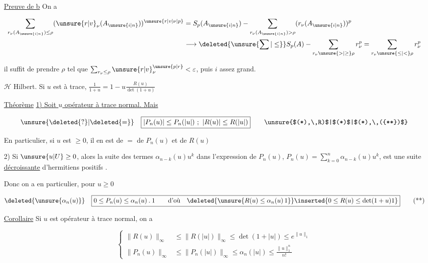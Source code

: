 
\uline{Preuve de b} On a

\[
\begin{aligned}
\sum_{r_\nu(A_{\unsure{i|n}})\leq\rho}(\unsure{r|v}_\nu(A_{\unsure{i|n}}))^{\unsure{r|v|\nu|p}}&=S_p(A_{\unsure{i|n}})-\sum_{r_\nu(A_{\unsure{i|n}})>\rho}(r_\nu(A_{\unsure{i|n}}))^p\\
&\longrightarrow\deleted{\unsure{\sum|\leq}} S_p(A)-\sum_{r_\nu\unsure{>|\geq}\rho}r_\nu^p=\sum_{r_\nu\unsure{\leq|<}\rho}r_\nu^p
\end{aligned}
\]

il suffit de prendre $\rho$ tel que $\sum_{r_\nu\leq\rho}\unsure{r|v}_\nu^{\unsure{p|r}}<\varepsilon$, puis $i$ assez grand.

$\mathscr H$ Hilbert. Si $u$ est à trace, $\frac1{1+u}=1-u\frac{R(u)}{\det(1+u)}$


\uline{Théorème} \uline{1) Soit $u$ opérateur  à trace normal. Mais}

\margin{\unsure{$*$}}
\[
\unsure{\deleted{?}|\deleted{=}}\quad
\boxed{|P_n(u)|\leq P_n(|u|)\ ;\ |R(u)|\leq R(|u|)}\tag*{\unsure{$(*),\,R)$|$(*)$|$(*),\,({**})$}}
\]

En particulier, si $u$ est $\geq0$, il en est de $=$ de $P_n(u)$ et de $R(u)$

2) Si $\unsure{u|U}\geq0$, alors la suite des termes $\alpha_{n-k}(u)u^k$ dans l'expression de $P_n(u)$, $P_n(u)=\sum_{k=0}^n\alpha_{n-k}(u)u^k$, est une suite \uline{décroissante} d'hermitiens positifs .

Donc on a en particulier, pour $u\geq0$

\[
\deleted{\unsure{\alpha_n(u)}}\quad
\boxed{0\leq P_n(u)\leq\alpha_n(u)\mathbin{.}1\qquad\text{d'où}\quad
\deleted{\unsure{R(u)\leq\alpha_n(u)\,1}}\inserted{0\leq R(u)\leq\det(1+u)1}}\tag*{(**)}
\]

 \uline{Corollaire} Si $u$ est opérateur  à trace normal, on a

\[
\left\{\begin{aligned}
\|R(u)\|_\infty&\leq\|R(|u|)\|_\infty\leq\det(1+|u|)\leq e^{\|u\|_1}\\
\|P_n(u)\|_\infty&\leq\|P_n(|u|)\|_\infty\leq\alpha_n(|u|)\leq\frac{\|u\|_1^n}{n!}
\end{aligned}\right.\tag*{(***)}
\]

